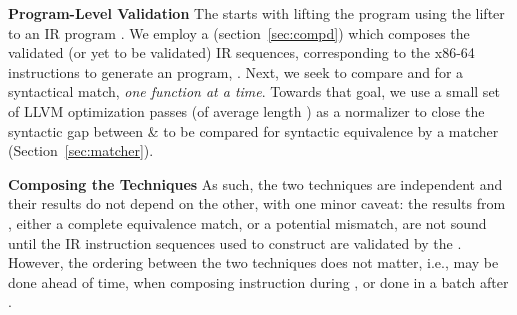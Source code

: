\textbf{Program-Level Validation} The \plv starts with lifting the \ISA
program  using the lifter  to an IR program .
%
We employ a \compd (section~\ref{sec:compd}) which composes the validated (or
yet to be validated) IR sequences, corresponding to the x86-64 instructions to
generate an \LLVM program, .
%
Next, we seek to compare  and  for a syntactical match,
\emph{one function at a time}. Towards that goal, we use a small set of LLVM
optimization passes (of average length \avgPassLength) as a normalizer to close the syntactic gap between 
\&  to be compared for syntactic equivalence by a matcher
(Section~\ref{sec:matcher}). 

\textbf{Composing the Techniques} As such, the two techniques are
independent and their results do not depend on the other, with one minor
caveat: the results from \plv, either a complete equivalence match, or a
potential mismatch, are not sound until the IR instruction sequences used to construct
 are validated by the \siv. However, the ordering between the two
techniques does not matter, i.e., \siv may be done ahead of time, when
composing instruction during \plv, or done in a batch after \plv.


